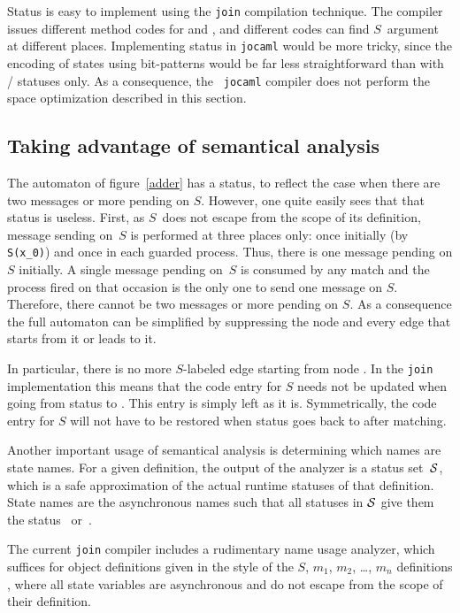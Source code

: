 Status  is easy to implement using the {\tt join}
compilation technique. The compiler issues different method codes for
 and , and different codes can find
$S$~argument at different places.  Implementing status  in
{\tt jocaml} would be more tricky, since the encoding of states using
bit-patterns would be far less straightforward than with
/ statuses only.  As a consequence, the {\tt
  jocaml} compiler does not perform the space optimization described
in this section.

\subsection{Taking advantage of semantical analysis}

The automaton of figure~\ref{adder} has a  status, to
reflect the case when there are two messages or more pending on $S$.
However, one quite easily sees that that status  is
useless.  First, as $S$~does not escape from the scope of its
definition, message sending on~$S$ is performed at three places only:
once initially (by \verb+S(x_0)+) and once in each guarded process.
Thus, there is one message pending on $S$ initially.  A single message
pending on~$S$ is consumed by any match and the process fired on that
occasion is the only one to send one message on $S$. Therefore, there
cannot be two messages or more pending on $S$. As a consequence the
full automaton can be simplified by suppressing the  node
and every edge that starts from it or leads to it.

In particular, there is no more $S$-labeled edge starting from node
. In the {\tt join} implementation this means that 
the code entry for $S$ needs not be updated when going from status
 to . This entry is simply left as it is.
Symmetrically, the code entry for $S$ will not have to be restored when
status goes back to  after matching.




Another important usage of semantical analysis is determining which names
are state names.  For a given definition, the output of the
analyzer is a status set~${\cal S}$, which is a safe approximation of
the actual runtime statuses of that definition.  State names are the
asynchronous names such that all statuses in ${\cal S}$ give them the
status ~or~.

The current {\tt join} compiler includes a rudimentary
name usage analyzer, which suffices for object definitions given in
the style of 
the $S$, $m_1$, $m_2$, \ldots, $m_n$ definitions , where all state
variables are asynchronous and do not escape from the scope of their
definition.

